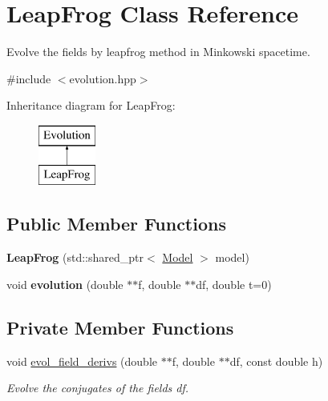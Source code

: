 \hypertarget{class_leap_frog}{}\section{Leap\+Frog Class Reference}
\label{class_leap_frog}


Evolve the fields by leapfrog method in Minkowski spacetime.  




{\ttfamily \#include $<$evolution.\+hpp$>$}

Inheritance diagram for Leap\+Frog\+:\begin{figure}[H]
\begin{center}
\leavevmode
\includegraphics[height=2.000000cm]{class_leap_frog}
\end{center}
\end{figure}
\subsection*{Public Member Functions}
\begin{DoxyCompactItemize}
\item 
\mbox{\label{class_leap_frog_a33b123fe88e71783cecdd1b9d0072c3f}} 
{\bfseries Leap\+Frog} (std\+::shared\+\_\+ptr$<$ \mbox{\hyperlink{class_model}{Model}} $>$ model)
\item 
\mbox{\label{class_leap_frog_aa7b62954828a05501f8fb3192a65876a}} 
void {\bfseries evolution} (double $\ast$$\ast$f, double $\ast$$\ast$df, double t=0)
\end{DoxyCompactItemize}
\subsection*{Private Member Functions}
\begin{DoxyCompactItemize}
\item 
void \mbox{\hyperlink{class_leap_frog_a0798b7d6bfdf2f19e5bce08c4ce17d29}{evol\+\_\+field\+\_\+derivs}} (double $\ast$$\ast$f, double $\ast$$\ast$df, const double h)
\begin{DoxyCompactList}\small\item\em Evolve the conjugates of the fields df. \end{DoxyCompactList}\end{DoxyCompactItemize}

